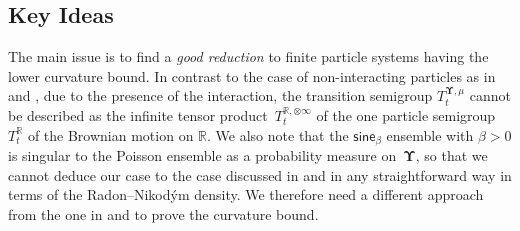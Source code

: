 \documentclass[11pt,letterpaper]{amsart}
\newcommand{\R}{{\mathbb R}}
\newcommand{\purple}[1]{{\color{purple}#1}}
\newcommand{\QP}{{\mu}}
\newcommand{\dUpsilon}{{\mathbf \Upsilon}}
\newcommand{\U}{\dUpsilon}
\newcommand{\sine}{\mathsf{sine}}
\renewcommand{\1}{\mathbf 1}
\numberwithin{equation}{section}
\theoremstyle{plain}
\theoremstyle{definition}
\theoremstyle{remark}
\begin{document}
\subsection*{Key Ideas}The main issue is to find a {\it good reduction} to finite particle systems  having the lower curvature bound.
In contrast to the case of non-interacting particles as in \cite{ErbHue15} and \cite{LzDSSuz22}, due to the presence of the interaction, the transition semigroup $T_t^{\U, \QP}$ cannot be described as the infinite tensor product~$T_t^{\R, \otimes \infty}$ of  the one particle semigroup~$T_t^{\R}$ of the Brownian motion on $\R$. We also note that the $\sine_\beta$ ensemble with $\beta>0$ is singular to the Poisson ensemble as a probability measure on~$\U$, so that we cannot deduce our case to the case discussed in \cite{ErbHue15} and \cite{LzDSSuz22} in any straightforward way in terms of the Radon--Nikod\'ym density. We therefore need a different approach from the one in \cite{ErbHue15} and \cite{LzDSSuz22} to prove the curvature bound.

\end{document}
